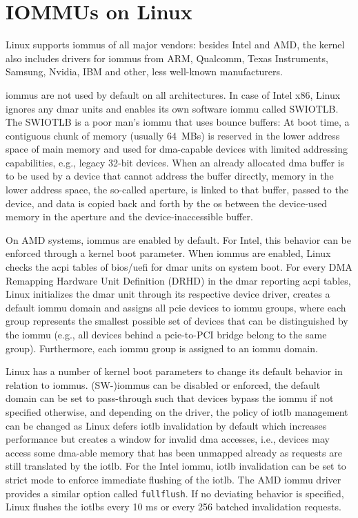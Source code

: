 \section{IOMMUs on Linux}
\label{sec:iommus_on_linux}

Linux supports \acp{iommu} of all major vendors: besides Intel and AMD, the
kernel also includes drivers for \acp{iommu} from ARM, Qualcomm, Texas
Instruments, Samsung, Nvidia, IBM and other, less well-known manufacturers.

\acp{iommu} are not used by default on all architectures. In case of Intel x86,
Linux ignores any \ac{dmar} units and enables its own software \ac{iommu} called
SWIOTLB. The SWIOTLB is a poor man's \ac{iommu} that uses bounce buffers: At
boot time, a contiguous chunk of memory (usually 64~MBs) is reserved in the
lower address space of main memory and used for \ac{dma}-capable devices with
limited addressing capabilities, e.g., legacy 32-bit devices. When an already
allocated \ac{dma} buffer is to be used by a device that cannot address the
buffer directly, memory in the lower address space, the so-called aperture, is
linked to that buffer, passed to the device, and data is copied back and forth
by the \ac{os} between the device-used memory in the aperture and the
device-inaccessible buffer.

On AMD systems, \acp{iommu} are enabled by default. For Intel, this behavior can
be enforced through a kernel boot parameter. When \acp{iommu} are enabled, Linux
checks the \acs{acpi} tables of \ac{bios}/\ac{uefi} for \ac{dmar} units on
system boot. For every DMA Remapping Hardware Unit Definition (DRHD) in the
\ac{dmar} reporting \ac{acpi} tables, Linux initializes the \ac{dmar} unit
through its respective device driver, creates a default \ac{iommu} domain and
assigns all \ac{pcie} devices to \ac{iommu} groups, where each group represents
the smallest possible set of devices that can be distinguished by the \ac{iommu}
(e.g., all devices behind a \ac{pcie}-to-PCI bridge belong to the same group).
Furthermore, each \ac{iommu} group is assigned to an \ac{iommu} domain.

Linux has a number of kernel boot parameters to change its default behavior in
relation to \acp{iommu}. (SW-)\acp{iommu} can be disabled or enforced, the
default domain can be set to pass-through such that devices bypass the
\ac{iommu} if not specified otherwise, and depending on the driver, the policy
of \ac{iotlb} management can be changed as Linux defers \ac{iotlb} invalidation
by default which increases performance but creates a window for invalid \ac{dma}
accesses, i.e., devices may access some \ac{dma}-able memory that has been
unmapped already as requests are still translated by the \ac{iotlb}. For the
Intel \ac{iommu}, \ac{iotlb} invalidation can be set to strict mode to enforce
immediate flushing of the \ac{iotlb}. The AMD \ac{iommu} driver provides a
similar option called \texttt{fullflush}. If no deviating behavior is specified,
Linux flushes the \acp{iotlb} every 10 ms or every 256 batched invalidation
requests.

